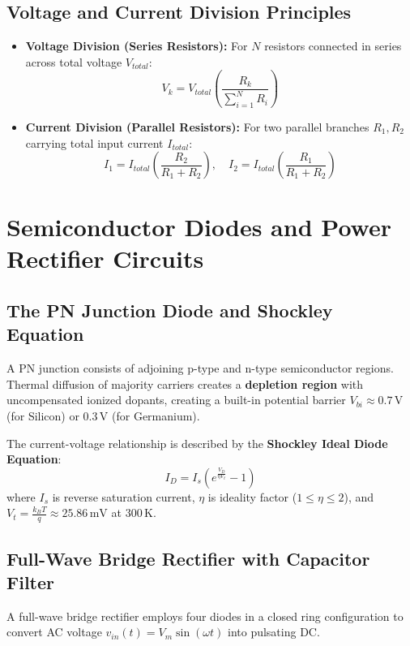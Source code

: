 \subsection{Voltage and Current Division Principles}
\begin{itemize}
    \item \textbf{Voltage Division (Series Resistors):} For $N$ resistors connected in series across total voltage $V_{total}$:
    \begin{equation}
        V_k = V_{total} \left(\frac{R_k}{\sum_{i=1}^N R_i}\right)
    \end{equation}
    \item \textbf{Current Division (Parallel Resistors):} For two parallel branches $R_1, R_2$ carrying total input current $I_{total}$:
    \begin{equation}
        I_1 = I_{total} \left(\frac{R_2}{R_1 + R_2}\right), \quad I_2 = I_{total} \left(\frac{R_1}{R_1 + R_2}\right)
    \end{equation}
\end{itemize}

\section{Semiconductor Diodes and Power Rectifier Circuits}
\subsection{The PN Junction Diode and Shockley Equation}
A PN junction consists of adjoining p-type and n-type semiconductor regions. Thermal diffusion of majority carriers creates a \textbf{depletion region} with uncompensated ionized dopants, creating a built-in potential barrier $V_{bi} \approx 0.7\,\text{V}$ (for Silicon) or $0.3\,\text{V}$ (for Germanium).

The current-voltage relationship is described by the \textbf{Shockley Ideal Diode Equation}:
\begin{equation}
    I_D = I_s \left(e^{\frac{V_D}{\eta V_t}} - 1\right)
\end{equation}
where $I_s$ is reverse saturation current, $\eta$ is ideality factor ($1 \le \eta \le 2$), and $V_t = \frac{k_BT}{q} \approx 25.86\,\text{mV}$ at $300\,\text{K}$.

\subsection{Full-Wave Bridge Rectifier with Capacitor Filter}
A full-wave bridge rectifier employs four diodes in a closed ring configuration to convert AC voltage $v_{in}(t) = V_m \sin(\omega t)$ into pulsating DC.

